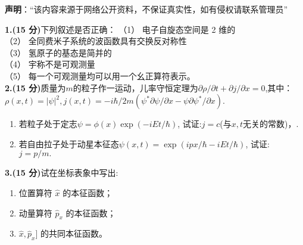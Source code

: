 
\textbf{声明}：“该内容来源于网络公开资料，不保证真实性，如有侵权请联系管理员”

\textbf{1.(15 分)}下列叙述是否正确：
（1） 电子自旋态空间是 2 维的\\
（2） 全同费米子系统的波函数具有交换反对称性\\
（3） 氢原子的基态是简并的\\
（4） 宇称不是可观测量\\
（5） 每一个可观测量均可以用一个幺正算符表示。\\

\textbf{2.(15 分)}质量为$m$的粒子作一运动，儿率守恒定理为$\partial \rho/\partial t + \partial j/\partial x = 0$,其中：$\rho(x, t) = |\psi|^2,j(x, t) = -i\hbar/2m \left( \psi^* \partial \psi/\partial x - \psi \partial \psi^*/\partial x \right).$
\begin{enumerate}
\item 若粒子处于定志$\psi = \phi(x) \exp(-iEt/\hbar)$, 试证:$j=c$(与$x,t$无关的常数)，.
\item 若自由拉子处于动星本征态$\psi(x, t) = \exp(ipx/\hbar - iEt/\hbar)$, 试证: $j = p/m.$
\end{enumerate}

\textbf{3.(15 分)}试在坐标表象中写出:
\begin{enumerate}
        \item 位置算符 $\hat{x}$ 的本征函数；
        \item 动量算符 $\hat{p}_x$ 的本征函数；
        \item $\hat{x}, \hat{p}_x]$ 的共同本征函数。
    \end{enumerate}

